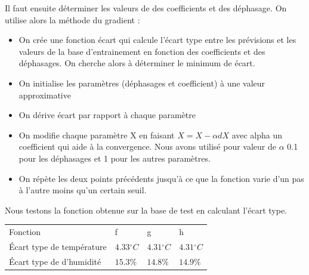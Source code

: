 \documentclass[11pt,a4paper]{article}
\begin{document}
Il faut ensuite déterminer les valeurs de des coefficients et des déphasage. On utilise alors la méthode du gradient :
\begin{itemize}
\item On crée une fonction écart qui calcule l'écart type entre les prévisions et les valeurs de la base d'entrainement en fonction des coefficients et des déphasages. On cherche alors à déterminer le minimum de écart.
\item On initialise les paramètres (déphasages et coefficient) à une valeur approximative
\item On dérive écart par rapport à chaque paramètre
\item On modifie chaque paramètre X en faisant $ X = X - \alpha  dX $ avec alpha un coefficient qui aide à la convergence. Nous avons utilisé pour valeur de $\alpha$ 0.1 pour les déphasages et 1 pour les autres paramètres.
\item On répète les deux points précédents jusqu'à ce que la fonction varie d'un pas à l'autre moins qu'un certain seuil.
\end{itemize}

Nous testons la fonction obtenue sur la base de test en calculant l'écart type.

\begin{tabular}{llll}\hline
\hline
Fonction                             &f                         &g                       &h \\
Écart type de température & $4.33{}^{\circ}C$   & $4.31{}^{\circ}C$   &  $4.31{}^{\circ}C$ \\ 
Écart type de d'humidité    & $15.3\%$   & $14.8\%$   &  $14.9\%$   \\   
\hline 
\end{tabular}
\end{document}
